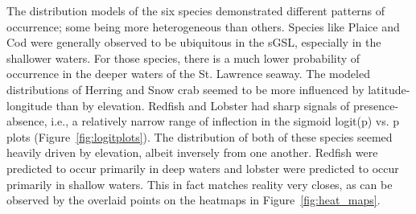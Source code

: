 The distribution models of the six species demonstrated different patterns of occurrence; some being more heterogeneous than others.
Species like Plaice and Cod were generally observed to be ubiquitous in the sGSL, especially in the shallower waters.
For those species, there is a much lower probability of occurrence in the deeper waters of the St. Lawrence seaway.
The modeled distributions of Herring and Snow crab seemed to be more influenced by latitude-longitude than by elevation.
Redfish and Lobster had sharp signals of presence-absence, i.e., a relatively narrow range of inflection in the sigmoid
logit(p) vs. p plots (Figure~\ref{fig:logitplots}).
The distribution of both of these species seemed heavily driven by elevation, albeit inversely from one another.
Redfish were predicted to occur primarily in deep waters and lobster were predicted to occur primarily in shallow waters.
This in fact matches reality very closes, as can be observed by the overlaid points on the heatmaps in Figure~\ref{fig:heat_maps}.


